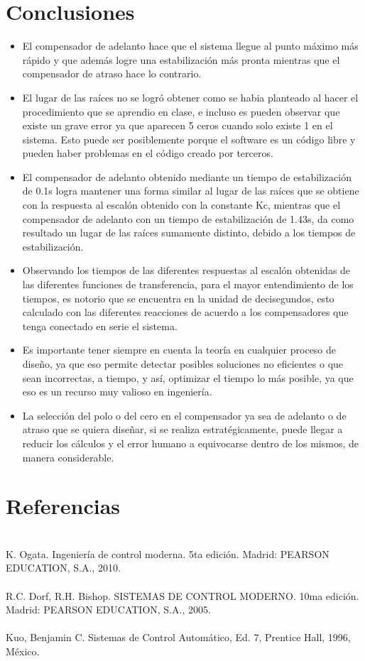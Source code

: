 \documentclass[12pt,letterpaper]{article}
\begin{document}
\section{Conclusiones}
\begin{itemize}
    \item El compensador de adelanto hace que el sistema llegue al punto máximo más rápido y que además logre una estabilización más pronta mientras que el compensador de atraso hace lo contrario. 
    \item El lugar de las raíces no se logró obtener como se habia planteado al hacer el procedimiento que se aprendio en clase, e incluso es pueden observar que existe un grave error ya que aparecen 5 ceros cuando solo existe 1 en el sistema. Esto puede ser posiblemente porque el software es un código libre y pueden haber problemas en el código creado por terceros.
    \item El compensador de adelanto obtenido mediante un tiempo de estabilización de 0.1s logra mantener una forma similar al lugar de las raíces que se obtiene con la respuesta al escalón obtenido con la constante Kc, mientras que el compensador de adelanto con un tiempo de estabilización de 1.43s, da como resultado un lugar de las raíces sumamente distinto, debido a los tiempos de estabilización. 
    \item Observando los tiempos de las diferentes respuestas al escalón obtenidas de las diferentes funciones de transferencia, para el mayor entendimiento de los tiempos, es notorio que se encuentra en la unidad de decisegundos, esto calculado con las diferentes reacciones de acuerdo a los compensadores que tenga conectado en serie el sistema.
    \item Es importante tener siempre en cuenta la teoría en cualquier proceso de diseño, ya que eso permite detectar posibles soluciones no eficientes o que sean incorrectas, a tiempo, y así, optimizar el tiempo lo más posible, ya que eso es un recurso muy valioso en ingeniería.
    \item La selección del polo o del cero en el compensador ya sea de adelanto o de atraso que se quiera diseñar, si se realiza estratégicamente, puede llegar a reducir los cálculos y el error humano a equivocarse dentro de los mismos, de manera considerable.
    
\end{itemize}

\section{Referencias} \\
[1] K. Ogata. Ingeniería de control moderna. 5ta edición. Madrid: PEARSON EDUCATION, S.A., 2010.\\
\\
[2] R.C. Dorf, R.H. Bishop. SISTEMAS DE CONTROL MODERNO. 10ma edición. Madrid: PEARSON EDUCATION, S.A., 2005.\\
\\
[3] Kuo, Benjamin C. Sistemas de Control Automático, Ed. 7, Prentice Hall,
1996, México.
\end{document}

